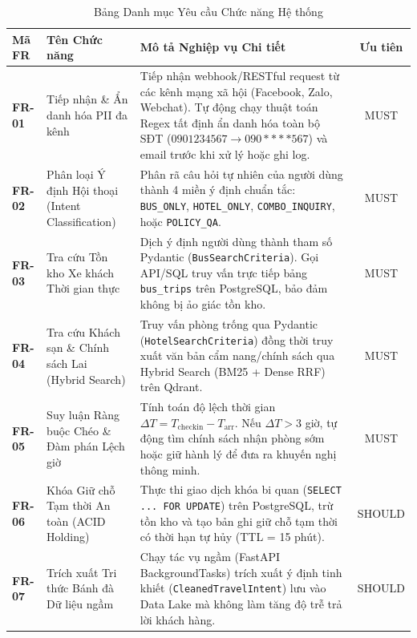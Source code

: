 \begin{table}[h!]
\centering
\small
\begin{tabular}{|l|p{3.8cm}|p{6.5cm}|c|}
\hline
\textbf{Mã FR} & \textbf{Tên Chức năng} & \textbf{Mô tả Nghiệp vụ Chi tiết} & \textbf{Ưu tiên} \\
\hline
\textbf{FR-01} & Tiếp nhận \& Ẩn danh hóa PII đa kênh & Tiếp nhận webhook/RESTful request từ các kênh mạng xã hội (Facebook, Zalo, Webchat). Tự động chạy thuật toán Regex tất định ẩn danh hóa toàn bộ SĐT ($0901234567 \rightarrow 090****567$) và email trước khi xử lý hoặc ghi log. & MUST \\
\hline
\textbf{FR-02} & Phân loại Ý định Hội thoại (Intent Classification) & Phân rã câu hỏi tự nhiên của người dùng thành 4 miền ý định chuẩn tắc: \texttt{BUS\_ONLY}, \texttt{HOTEL\_ONLY}, \texttt{COMBO\_INQUIRY}, hoặc \texttt{POLICY\_QA}. & MUST \\
\hline
\textbf{FR-03} & Tra cứu Tồn kho Xe khách Thời gian thực & Dịch ý định người dùng thành tham số Pydantic (\texttt{BusSearchCriteria}). Gọi API/SQL truy vấn trực tiếp bảng \texttt{bus\_trips} trên PostgreSQL, bảo đảm không bị ảo giác tồn kho. & MUST \\
\hline
\textbf{FR-04} & Tra cứu Khách sạn \& Chính sách Lai (Hybrid Search) & Truy vấn phòng trống qua Pydantic (\texttt{HotelSearchCriteria}) đồng thời truy xuất văn bản cẩm nang/chính sách qua Hybrid Search (BM25 + Dense RRF) trên Qdrant. & MUST \\
\hline
\textbf{FR-05} & Suy luận Ràng buộc Chéo \& Đàm phán Lệch giờ & Tính toán độ lệch thời gian $\Delta T = T_{\text{checkin}} - T_{\text{arr}}$. Nếu $\Delta T > 3$ giờ, tự động tìm chính sách nhận phòng sớm hoặc giữ hành lý để đưa ra khuyến nghị thông minh. & MUST \\
\hline
\textbf{FR-06} & Khóa Giữ chỗ Tạm thời An toàn (ACID Holding) & Thực thi giao dịch khóa bi quan (\texttt{SELECT ... FOR UPDATE}) trên PostgreSQL, trừ tồn kho và tạo bản ghi giữ chỗ tạm thời có thời hạn tự hủy (TTL = 15 phút). & SHOULD \\
\hline
\textbf{FR-07} & Trích xuất Tri thức Bánh đà Dữ liệu ngầm & Chạy tác vụ ngầm (FastAPI BackgroundTasks) trích xuất ý định tinh khiết (\texttt{CleanedTravelIntent}) lưu vào Data Lake mà không làm tăng độ trễ trả lời khách hàng. & SHOULD \\
\hline
\end{tabular}
\caption{Bảng Danh mục Yêu cầu Chức năng Hệ thống}
\label{tab:functional_requirements}
\end{table}

